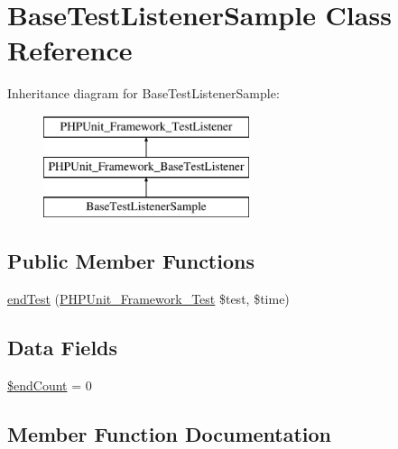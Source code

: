 \hypertarget{class_base_test_listener_sample}{}\section{Base\+Test\+Listener\+Sample Class Reference}
\label{class_base_test_listener_sample}
Inheritance diagram for Base\+Test\+Listener\+Sample\+:\begin{figure}[H]
\begin{center}
\leavevmode
\includegraphics[height=3.000000cm]{class_base_test_listener_sample}
\end{center}
\end{figure}
\subsection*{Public Member Functions}
\begin{DoxyCompactItemize}
\item 
\mbox{\hyperlink{class_base_test_listener_sample_a6de65eea8b294795cbc34c4c8cee8546}{end\+Test}} (\mbox{\hyperlink{interface_p_h_p_unit___framework___test}{P\+H\+P\+Unit\+\_\+\+Framework\+\_\+\+Test}} \$test, \$time)
\end{DoxyCompactItemize}
\subsection*{Data Fields}
\begin{DoxyCompactItemize}
\item 
\mbox{\hyperlink{class_base_test_listener_sample_a53e7546b5e2334b01c474ca4603d28a1}{\$end\+Count}} = 0
\end{DoxyCompactItemize}


\subsection{Member Function Documentation}
\mbox{\label{class_base_test_listener_sample_a6de65eea8b294795cbc34c4c8cee8546}} 
